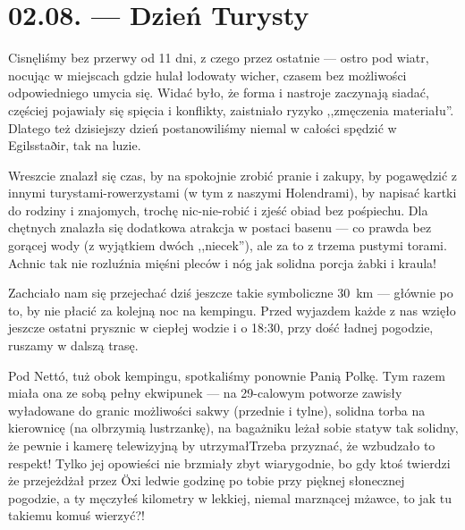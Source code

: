 \chapter*{02.08. --- Dzień Turysty}


Cisnęliśmy bez przerwy od 11 dni, z czego przez ostatnie --- ostro pod wiatr, nocując w miejscach gdzie hulał lodowaty wicher, czasem bez możliwości odpowiedniego umycia się. Widać było, że forma i nastroje zaczynają siadać, częściej pojawiały się spięcia i konflikty, zaistniało ryzyko ,,zmęczenia materiału''. Dlatego też dzisiejszy dzień postanowiliśmy niemal w całości spędzić w Egilsstaðir, tak na luzie.

Wreszcie znalazł się czas, by na spokojnie zrobić pranie i zakupy, by pogawędzić z innymi turystami-rowerzystami (w tym z naszymi Holendrami), by napisać kartki do rodziny i znajomych, trochę nic-nie-robić i zjeść obiad bez pośpiechu. Dla chętnych znalazła się dodatkowa atrakcja w postaci basenu --- co prawda bez gorącej wody (z wyjątkiem dwóch ,,niecek''), ale za to z trzema pustymi torami. Ach\textellipsis nic tak nie rozluźnia mięśni pleców i nóg jak solidna porcja żabki i kraula!


Zachciało nam się przejechać dziś jeszcze takie symboliczne 30~km --- głównie po to, by nie płacić za kolejną noc na kempingu. Przed wyjazdem każde z nas wzięło jeszcze ostatni prysznic w ciepłej wodzie i o 18:30, przy dość ładnej pogodzie, ruszamy w dalszą trasę.

Pod Nettó, tuż obok kempingu, spotkaliśmy ponownie Panią Polkę. Tym razem miała ona ze sobą pełny ekwipunek --- na 29-calowym potworze zawisły wyładowane do granic możliwości sakwy (przednie i tylne), solidna torba na kierownicę (na olbrzymią lustrzankę), na bagażniku leżał sobie statyw tak solidny, że pewnie i kamerę telewizyjną by utrzymał\textellipsis Trzeba przyznać, że wzbudzało to respekt! Tylko jej opowieści nie brzmiały zbyt wiarygodnie, bo gdy ktoś twierdzi że przejeżdżał przez Öxi ledwie godzinę po tobie przy pięknej słonecznej pogodzie, a ty męczyłeś kilometry w lekkiej, niemal marznącej mżawce, to jak tu takiemu komuś wierzyć?!

